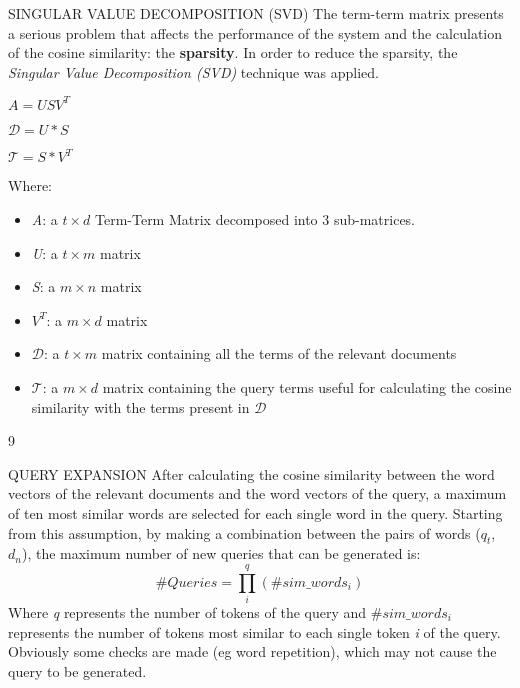 \begin{frame}{SINGULAR VALUE DECOMPOSITION (SVD)}
    The term-term matrix presents a serious problem that affects 
    the performance of the system and the calculation of the cosine similarity: 
    the {\bfseries{sparsity}}. In order to reduce the sparsity, the \emph{Singular 
    Value Decomposition (SVD)} technique was applied.
    \begin{minipage}{\linewidth}
        \centering
        \begin{minipage}{0.20\linewidth}
            \begin{block}{}
                \centering $ A = USV^T $
            \end{block}
            \begin{block}{}
                \centering $ \mathcal{D} = U*S $
            \end{block}
            \begin{block}{}
                \centering $ \mathcal{T} = S*V^T $
            \end{block}
        \end{minipage}
        \hspace{0.05\linewidth}
        \begin{minipage}{0.60\linewidth}
            Where:
            \begin{itemize}
                \item \emph{A}: a $t\times d$ Term-Term Matrix decomposed into 3 sub-matrices.
                \item \emph{U}: a $t\times m$ matrix
                \item \emph{S}: a $m\times n$ matrix
                \item \emph{$V^T$}: a $m\times d$ matrix
                \item \emph{$\mathcal{D}$}: a $t\times m$ matrix containing all the terms of the relevant documents
                \item \emph{$\mathcal{T}$}: a $m\times d$ matrix containing the query terms useful for calculating the cosine similarity with the terms present in $\mathcal{D}$
            \end{itemize}
        \end{minipage}
    \end{minipage}9
\end{frame}

\begin{frame}{QUERY EXPANSION}
    After calculating the cosine similarity between the word vectors of the 
    relevant documents and the word vectors of the query, a maximum of ten 
    most similar words are selected for each single word in the query. Starting 
    from this assumption, by making a combination between the pairs of 
    words ($q_t$, $d_n$), the maximum number of new queries that can be 
    generated is: 
    $$ \#Queries = \prod_i^q (\#sim\_words_i) $$
    Where \emph{q} represents the number of tokens of the query and \emph{$\#sim\_words_i$} 
    represents the number of tokens most similar to each single token \emph{i} of the 
    query. Obviously some checks are made (eg word repetition), which may 
    not cause the query to be generated.
\end{frame}

